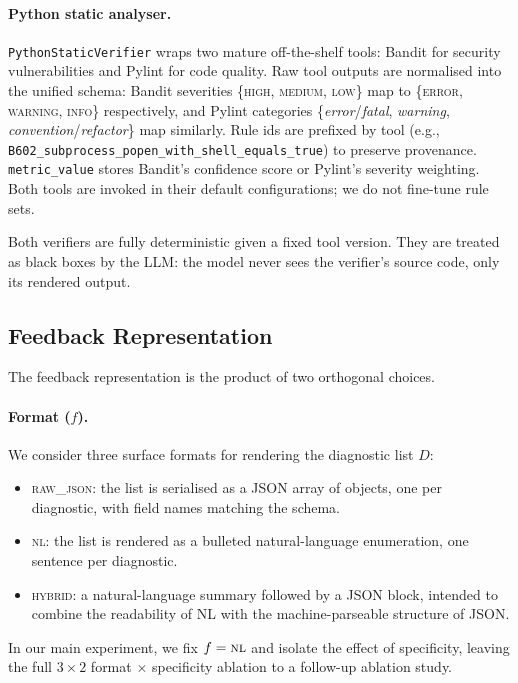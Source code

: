 \paragraph{Python static analyser.}
\texttt{PythonStaticVerifier} wraps two mature off-the-shelf tools: Bandit \cite{bandit2024} for security vulnerabilities and Pylint \cite{pylint2024} for code quality. Raw tool outputs are normalised into the unified schema: Bandit severities \{\textsc{high}, \textsc{medium}, \textsc{low}\} map to \{\textsc{error}, \textsc{warning}, \textsc{info}\} respectively, and Pylint categories \{\textit{error}/\textit{fatal}, \textit{warning}, \textit{convention}/\textit{refactor}\} map similarly. Rule ids are prefixed by tool (e.g., \texttt{B602\_subprocess\_popen\_with\_shell\_equals\_true}) to preserve provenance. \texttt{metric\_value} stores Bandit's confidence score or Pylint's severity weighting. Both tools are invoked in their default configurations; we do not fine-tune rule sets.

Both verifiers are fully deterministic given a fixed tool version. They are treated as black boxes by the LLM: the model never sees the verifier's source code, only its rendered output.

\subsection{Feedback Representation}
\label{sec:feedback}

The feedback representation is the product of two orthogonal choices.

\paragraph{Format ($f$).}
We consider three surface formats for rendering the diagnostic list $D$:
\begin{itemize}
    \item \textsc{raw\_json}: the list is serialised as a JSON array of objects, one per diagnostic, with field names matching the schema.
    \item \textsc{nl}: the list is rendered as a bulleted natural-language enumeration, one sentence per diagnostic.
    \item \textsc{hybrid}: a natural-language summary followed by a JSON block, intended to combine the readability of NL with the machine-parseable structure of JSON.
\end{itemize}
In our main experiment, we fix $f = \textsc{nl}$ and isolate the effect of specificity, leaving the full $3 \times 2$ format $\times$ specificity ablation to a follow-up ablation study.

